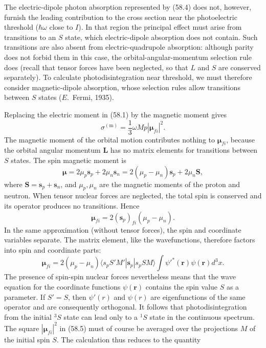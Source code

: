 The electric-dipole photon absorption represented by (58.4) does not, however, furnish the leading contribution to the cross section near the photoelectric threshold ($\hbar\omega$ close to $I$). In that region the principal effect must arise from transitions to an $S$ state, which electric-dipole absorption does not contain. Such transitions are also absent from electric-quadrupole absorption: although parity does not forbid them in this case, the orbital-angular-momentum selection rule does (recall that tensor forces have been neglected, so that $L$ and $S$ are conserved separately). To calculate photodisintegration near threshold, we must therefore consider magnetic-dipole absorption, whose selection rules allow transitions between $S$ states ($E$.~Fermi, 1935).

Replacing the electric moment in (58.1) by the magnetic moment gives
\begin{equation}
\sigma^{(\mathrm m)}=\frac13\omega Mp|\boldsymbol\mu_{fi}|^2.
\tag{58.5}
\end{equation}
The magnetic moment of the orbital motion contributes nothing to $\boldsymbol\mu_{fi}$, because the orbital angular momentum $\mathbf L$ has no matrix elements for transitions between $S$ states. The spin magnetic moment is
\[
\boldsymbol\mu=2\mu_p\mathbf s_p+2\mu_n\mathbf s_n
=2(\mu_p-\mu_n)\mathbf s_p+2\mu_n\mathbf S,
\]
where $\mathbf S=\mathbf s_p+\mathbf s_n$, and $\mu_p,\mu_n$ are the magnetic moments of the proton and neutron. When tensor nuclear forces are neglected, the total spin is conserved and its operator produces no transitions. Hence
\[
\boldsymbol\mu_{fi}=2(\mathbf s_p)_{fi}(\mu_p-\mu_n).
\]
In the same approximation (without tensor forces), the spin and coordinate variables separate. The matrix element, like the wavefunctions, therefore factors into spin and coordinate parts:
\[
\boldsymbol\mu_{fi}=2(\mu_p-\mu_n)
\langle s_pS'M'|\mathbf s_p|s_pSM\rangle
\int\psi'^*(\mathbf r)\psi(\mathbf r)d^3x.
\]
The presence of spin-spin nuclear forces nevertheless means that the wave equation for the coordinate functions $\psi(\mathbf r)$ contains
the spin value $S$ as a parameter. If $S'=S$, then $\psi'(r)$ and $\psi(r)$ are eigenfunctions of the same operator and are consequently orthogonal. It follows that photodisintegration from the initial $^{3}S$ state can lead only to a $^{1}S$ state in the continuous spectrum.
The square $|\boldsymbol\mu_{fi}|^2$ in (58.5) must of course be averaged over the projections $M$ of the initial spin $S$. The calculation thus reduces to the quantity
